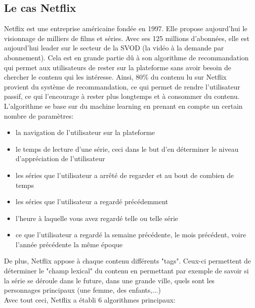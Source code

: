 \documentclass[light]{ceri}
\begin{document}
\subsection{Le cas Netflix}
Netflix est une entreprise américaine fondée en 1997. Elle propose aujourd'hui le visionnage de milliers de films et séries. Avec ses 125 millions d'abonnées, elle est aujourd'hui leader sur le secteur de la SVOD (la vidéo à la demande par abonnement). Cela est en grande partie dû à son algorithme de recommandation qui permet aux utilisateurs de rester sur la plateforme sans avoir besoin de chercher le contenu qui les intéresse. Ainsi, 80\% du contenu lu sur Netflix provient du système de recommandation, ce qui permet de rendre l'utilisateur passif, ce qui l'encourage à rester plus longtemps et à consommer du contenu.\\
\indent L'algorithme se base sur du machine learning en prenant en compte un certain nombre de paramètres:
\begin{itemize}
    \item la navigation de l'utilisateur sur la plateforme
    \item le temps de lecture d'une série, ceci dans le but d'en déterminer le niveau d'appréciation de l'utilisateur
    \item les séries que l'utilisateur a arrêté de regarder et au bout de combien de temps
    \item les séries que l'utilisateur a regardé précédemment
    \item l'heure à laquelle vous avez regardé telle ou telle série
    \item ce que l'utilisateur a regardé la semaine précédente, le mois précédent, voire l'année précédente la même époque
\end{itemize}
De plus, Netflix appose à chaque contenu différents "tags". Ceux-ci permettent de déterminer le "champ lexical" du contenu en permettant par exemple de savoir si la série se déroule dans le future, dans une grande ville, quels sont les personnages principaux (une femme, des enfants,...)\\
\indent Avec tout ceci, Netflix a établi 6 algorithmes principaux:
\end{document}

